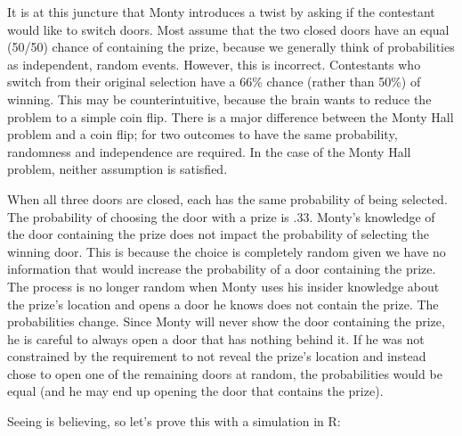 \documentclass[
]{book}
\begin{document}
It is at this juncture that Monty introduces a twist by asking if the contestant would like to switch doors. Most assume that the two closed doors have an equal (50/50) chance of containing the prize, because we generally think of probabilities as independent, random events. However, this is incorrect. Contestants who switch from their original selection have a 66\% chance (rather than 50\%) of winning. This may be counterintuitive, because the brain wants to reduce the problem to a simple coin flip. There is a major difference between the Monty Hall problem and a coin flip; for two outcomes to have the same probability, randomness and independence are required. In the case of the Monty Hall problem, neither assumption is satisfied.

When all three doors are closed, each has the same probability of being selected. The probability of choosing the door with a prize is .33. Monty's knowledge of the door containing the prize does not impact the probability of selecting the winning door. This is because the choice is completely random given we have no information that would increase the probability of a door containing the prize. The process is no longer random when Monty uses his insider knowledge about the prize's location and opens a door he knows does not contain the prize. The probabilities change. Since Monty will never show the door containing the prize, he is careful to always open a door that has nothing behind it. If he was not constrained by the requirement to not reveal the prize's location and instead chose to open one of the remaining doors at random, the probabilities would be equal (and he may end up opening the door that contains the prize).

Seeing is believing, so let's prove this with a simulation in R:
\end{document}

